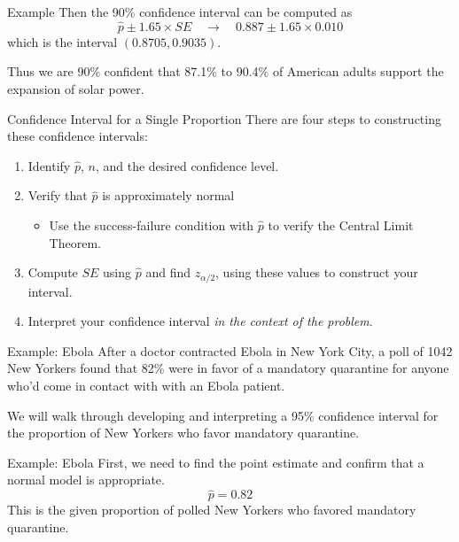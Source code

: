 \begin{frame}{Example}
    Then the 90\% confidence interval can be computed as
    \[
        \hat{p} \pm 1.65 \times SE \quad\longrightarrow\quad 0.887 \pm 1.65 \times 0.010
    \]
    which is the interval $(0.8705,0.9035)$. 
    
    \vspace{12pt}Thus we are 90\% confident that 87.1\% to 90.4\% of American adults support the expansion of solar power.
\end{frame}

\begin{frame}{Confidence Interval for a Single Proportion}
    There are four steps to constructing these confidence intervals:
    \begin{enumerate}
        \item Identify $\hat{p}$, $n$, and the desired confidence level.
        \item Verify that $\hat{p}$ is approximately normal 
        \begin{itemize}
            \item Use the success-failure condition with $\hat{p}$ to verify the Central Limit Theorem.
        \end{itemize}
        \item Compute $SE$ using $\hat{p}$ and find $z_{\alpha/2}$, using these values to construct your interval.
        \item Interpret your confidence interval \textit{in the context of the problem}.
    \end{enumerate}
\end{frame}

\begin{frame}{Example: Ebola}
    After a doctor contracted Ebola in New York City, a poll of 1042 New Yorkers found that 82\% were in favor of a mandatory quarantine for anyone who'd come in contact with with an Ebola patient.
    
    \vspace{12pt}We will walk through developing and interpreting a 95\% confidence interval for the proportion of New Yorkers who favor mandatory quarantine.
\end{frame}

\begin{frame}{Example: Ebola}
    First, we need to find the point estimate and confirm that a normal model is appropriate.
    \[
        \hat{p} = 0.82
    \]
    This is the given proportion of polled New Yorkers who favored mandatory quarantine.
\end{frame}

